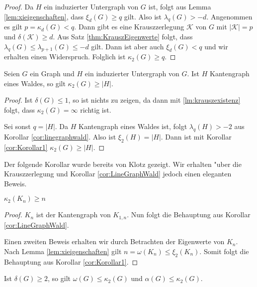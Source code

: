 \begin{proof}
  Da $H$ ein induzierter Untergraph von $G$ ist, folgt aus Lemma \ref{lem:xieigenschaften}, dass $\xi_{d}(G) \geq q$ gilt. Also ist $\lambda_{q}(G) > -d$. 
  Angenommen es gilt $p = \kappa_{d}(G) < q$. Dann gibt es  eine Krauszzerlegung $\mathcal{K}$ von $G$ mit $|\mathcal{K}| = p$ und $\delta(\mathcal{K}) \geq d$. Aus Satz \ref{thm:KrauszEigenwerte} folgt, dass $\lambda_{q}(G) \leq \lambda_{p+1}(G) \leq -d $ gilt. Dann ist aber auch $\xi_{d}(G) < q$ und wir erhalten einen Widerspruch. Folglich ist $\kappa_2(G) \geq q$.
\end{proof}

\begin{corollary}
  \label{cor:LineGraphWald}
  Seien $G$ ein Graph und $H$ ein induzierter Untergraph von $G$. Ist $H$ Kantengraph eines Waldes, so gilt 
  $\kappa_{2}(G)\geq \left|H\right|$.
\end{corollary}

\begin{proof}
  Ist $\delta(G) \leq 1$, so ist nichts zu zeigen, da dann mit \ref{lm:krauszexistenz} folgt, dass $\kappa_2(G) = \infty$ richtig ist.

  Sei sonst $q = |H|$. Da $H$ Kantengraph eines Waldes ist, folgt $\lambda_{q}(H) > -2$ aus Korollar \ref{cor:linegraphwald}. Also ist $\xi_{2}(H) = |H|$.
  Dann ist mit Korollar \ref{cor:Korollar1} $\kappa_{2}\left( G \right) \geq \left| H\right|$.
\end{proof}
Der folgende Korollar wurde bereits von Klotz \cite{Klotz89} gezeigt. Wir erhalten "uber die Krauszzerlegung und Korollar \ref{cor:LineGraphWald} jedoch einen eleganten Beweis.
\begin{corollary}[Klotz]
  $\kappa_{2}\left( K_n \right) \geq n$
\end{corollary}

\begin{proof}
  $K_n$ ist der Kantengraph von $K_{1,n}$. Nun folgt die Behauptung aus Korollar \ref{cor:LineGraphWald}.

  Einen zweiten Beweis erhalten wir durch Betrachten der Eigenwerte von $K_n$. Nach Lemma \ref{lem:xieigenschaften} gilt $n = \omega(K_n) \leq \xi_{2}(K_n)$. Somit folgt die Behauptung aus Korollar \ref{cor:Korollar1}.
\end{proof}

\begin{corollary}
  Ist $\delta\left( G \right) \geq 2$, so gilt $\omega\left( G \right)\leq \kappa_{2}\left( G \right)$ und $\alpha\left( G \right)\leq \kappa_{2}\left( G \right)$.
  \label{cor:alphaomegakrausz}
\end{corollary}

